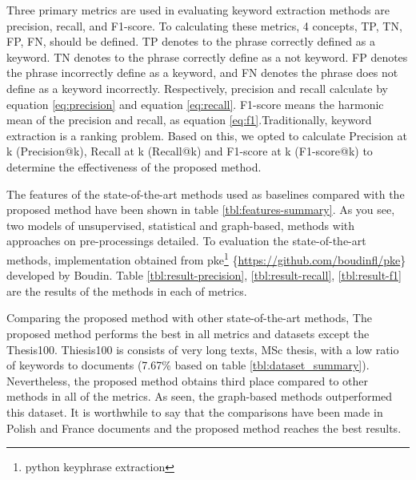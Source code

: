 \documentclass[3p]{elsarticle}
\begin{document}
Three primary metrics are used in evaluating keyword extraction methods are precision, recall, and F1-score. To calculating these metrics, 4 concepts, TP, TN, FP, FN, should be defined. TP denotes to the phrase correctly defined as a keyword. TN denotes to the phrase correctly define as a not keyword. FP denotes the phrase incorrectly define as a keyword, and FN denotes the phrase does not define as a keyword incorrectly. Respectively, precision and recall calculate by equation \ref{eq:precision} and equation \ref{eq:recall}. F1-score means the harmonic mean of the precision and recall, as equation \ref{eq:f1}.Traditionally, keyword extraction is a ranking problem. Based on this, we opted to calculate Precision at k (Precision@k), Recall at k (Recall@k) and F1-score at k (F1-score@k) to determine the effectiveness of the proposed method.











The features of the state-of-the-art methods used as baselines compared with the proposed method have been shown in table \ref{tbl:features-summary}. As you see, two models of unsupervised, statistical and graph-based, methods with approaches on pre-processings detailed. To evaluation the state-of-the-art methods, implementation obtained from pke\footnote{python keyphrase extraction} \{\url{https://github.com/boudinfl/pke}\} developed by Boudin. Table \ref{tbl:result-precision}, \ref{tbl:result-recall}, \ref{tbl:result-f1} are the results of the methods in each of metrics.

Comparing the proposed method with other state-of-the-art methods, The proposed method performs the best in all metrics and datasets except the Thesis100. Thiesis100 is consists of very long texts, MSc thesis, with a low ratio of keywords to documents (7.67\% based on table \ref{tbl:dataset_summary}). Nevertheless, the proposed method obtains third place compared to other methods in all of the metrics. As seen, the graph-based methods outperformed this dataset. It is worthwhile to say that the comparisons have been made in Polish and France documents and the proposed method reaches the best results.
\end{document}
